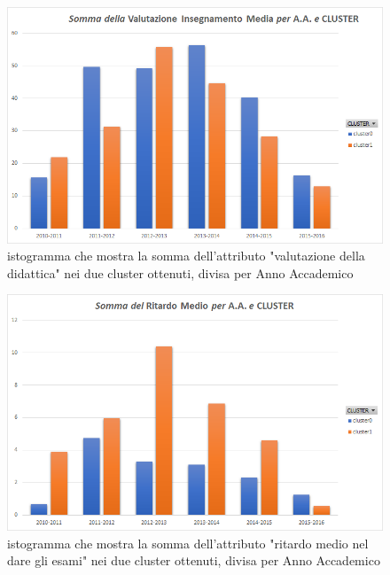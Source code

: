         \begin{figure}
            \centering
            \caption{istogramma che mostra la somma dell'attributo "valutazione della didattica" nei due cluster ottenuti, divisa per Anno Accademico}
            \label{eval}
            \includegraphics[scale=0.5]{../cluster/min_kmeans_2cl_eval.png}
        \end{figure}

        \begin{figure}
            \centering
            \caption{istogramma che mostra la somma dell'attributo "ritardo medio nel dare gli esami" nei due cluster ottenuti, divisa per Anno Accademico}
            \label{ritardo}
            \includegraphics[scale=0.5]{../cluster/min_kmeans_2cl_ritardo.png}
        \end{figure}

